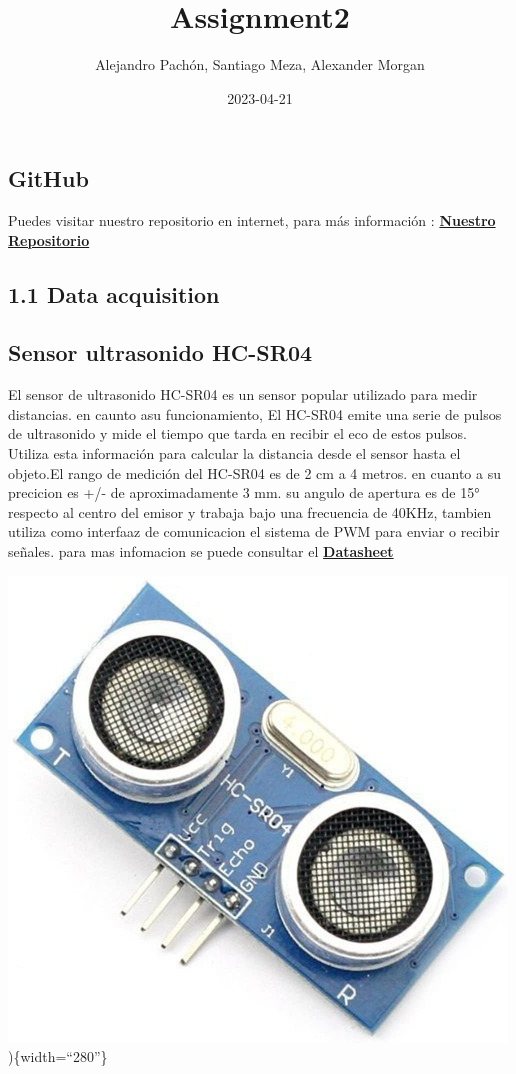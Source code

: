 \documentclass[
]{article}
\title{Assignment2}
\author{Alejandro Pachón, Santiago Meza, Alexander Morgan}
\date{2023-04-21}
\begin{document}
\maketitle

\hypertarget{github}{%
\subsection{GitHub}\label{github}}

Puedes visitar nuestro repositorio en internet, para más información :
\href{https://github.com/Alejandro29-tech/Assignment2}{\textbf{Nuestro
Repositorio}}

\hypertarget{data-acquisition}{%
\subsection{1.1 Data acquisition}\label{data-acquisition}}

\hypertarget{sensor-ultrasonido-hc-sr04}{%
\subsection{Sensor ultrasonido
HC-SR04}\label{sensor-ultrasonido-hc-sr04}}

El sensor de ultrasonido HC-SR04 es un sensor popular utilizado para
medir distancias. en caunto asu funcionamiento, El HC-SR04 emite una
serie de pulsos de ultrasonido y mide el tiempo que tarda en recibir el
eco de estos pulsos. Utiliza esta información para calcular la distancia
desde el sensor hasta el objeto.El rango de medición del HC-SR04 es de 2
cm a 4 metros. en cuanto a su precicion es +/- de aproximadamente 3 mm.
su angulo de apertura es de 15° respecto al centro del emisor y trabaja
bajo una frecuencia de 40KHz, tambien utiliza como interfaaz de
comunicacion el sistema de PWM para enviar o recibir señales. para mas
infomacion se puede consultar el
\href{http://www.datasheetcafe.com/hc-sr04-pdf-22772/}{\textbf{Datasheet}}

\includegraphics{images/hc-01.PNG})\{width=``280''\}
\end{document}
